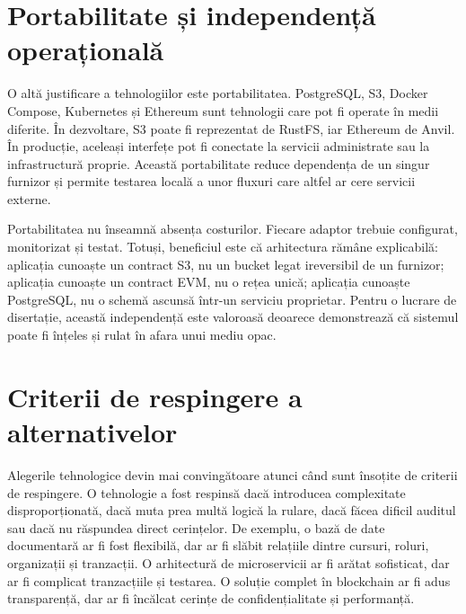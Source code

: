 \section{Portabilitate și independență operațională}
O altă justificare a tehnologiilor este portabilitatea. PostgreSQL, S3, Docker Compose, Kubernetes și Ethereum sunt tehnologii care pot fi operate în medii diferite. În dezvoltare, S3 poate fi reprezentat de RustFS, iar Ethereum de Anvil. În producție, aceleași interfețe pot fi conectate la servicii administrate sau la infrastructură proprie. Această portabilitate reduce dependența de un singur furnizor și permite testarea locală a unor fluxuri care altfel ar cere servicii externe.

Portabilitatea nu înseamnă absența costurilor. Fiecare adaptor trebuie configurat, monitorizat și testat. Totuși, beneficiul este că arhitectura rămâne explicabilă: aplicația cunoaște un contract S3, nu un bucket legat ireversibil de un furnizor; aplicația cunoaște un contract EVM, nu o rețea unică; aplicația cunoaște PostgreSQL, nu o schemă ascunsă într-un serviciu proprietar. Pentru o lucrare de disertație, această independență este valoroasă deoarece demonstrează că sistemul poate fi înțeles și rulat în afara unui mediu opac.

\section{Criterii de respingere a alternativelor}
Alegerile tehnologice devin mai convingătoare atunci când sunt însoțite de criterii de respingere. O tehnologie a fost respinsă dacă introducea complexitate disproporționată, dacă muta prea multă logică la rulare, dacă făcea dificil auditul sau dacă nu răspundea direct cerințelor. De exemplu, o bază de date documentară ar fi fost flexibilă, dar ar fi slăbit relațiile dintre cursuri, roluri, organizații și tranzacții. O arhitectură de microservicii ar fi arătat sofisticat, dar ar fi complicat tranzacțiile și testarea. O soluție complet în blockchain ar fi adus transparență, dar ar fi încălcat cerințe de confidențialitate și performanță.

